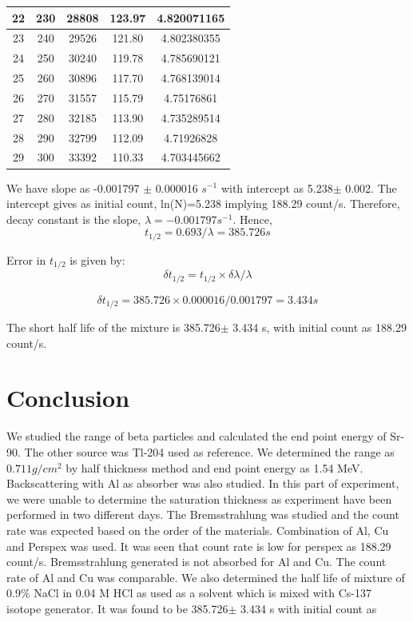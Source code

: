 \documentclass[a4paper, amsfonts, amssymb, amsmath, reprint, showkeys, nofootinbib, twoside]{revtex4-1}
\begin{document}
\begin{table}[H]
{\begin{tabular}{|c|c|c|c|c|}
			22 & 230 & 28808 & 123.97 & 4.820071165 \\ \hline
			23 & 240 & 29526 & 121.80 & 4.802380355 \\ \hline
			24 & 250 & 30240 & 119.78 & 4.785690121 \\ \hline
			25 & 260 & 30896 & 117.70 & 4.768139014 \\ \hline
			26 & 270 & 31557 & 115.79 & 4.75176861  \\ \hline
			27 & 280 & 32185 & 113.90 & 4.735289514 \\ \hline
			28 & 290 & 32799 & 112.09 & 4.71926828  \\ \hline
			29 & 300 & 33392 & 110.33 & 4.703445662 \\ \hline
		\end{tabular}%
}
\end{table}

We have slope as -0.001797 $\pm$ 0.000016 $s^{-1}$ with intercept as 5.238$\pm$ 0.002. The intercept gives as initial count, ln(N)=5.238 implying 188.29 count/s. Therefore, decay constant is the slope, $\lambda=-0.001797 s^{-1}$. Hence,
\begin{equation}
	t_{1/2}=0.693/\lambda=385.726 s
\end{equation}

Error in $t_{1/2}$ is given by:
\begin{equation}
	\delta t_{1/2}=t_{1/2}\times \delta \lambda/\lambda
\end{equation}

\begin{equation}
	\delta t_{1/2}=385.726\times 0.000016/0.001797=3.434s
\end{equation}

The short half life of the mixture is 385.726$\pm$ 3.434 s, with initial count as 188.29 count/s.

\section{Conclusion}
We studied the range of beta particles and calculated the end point energy of Sr-90. The other source was Tl-204 used as reference. We determined the range as $0.711 g/cm^2$ by half thickness method and end point energy as 1.54 MeV. Backscattering with Al as absorber was also studied. In this part of experiment, we were unable to determine the saturation thickness as experiment have been performed in two different days. The Bremsstrahlung was studied and the count rate was expected based on the order of the materials. Combination of Al, Cu and Perspex was used. It was seen that count rate is low for perspex as 188.29 count/s. Bremsstrahlung generated is not absorbed for Al and Cu. The count rate of Al and Cu was comparable. We also determined the half life of mixture of 0.9\% NaCl in 0.04 M HCl as used as a solvent which is mixed with Cs-137 isotope generator. It was found to be 385.726$\pm$ 3.434 s with initial count as 
\end{document}
